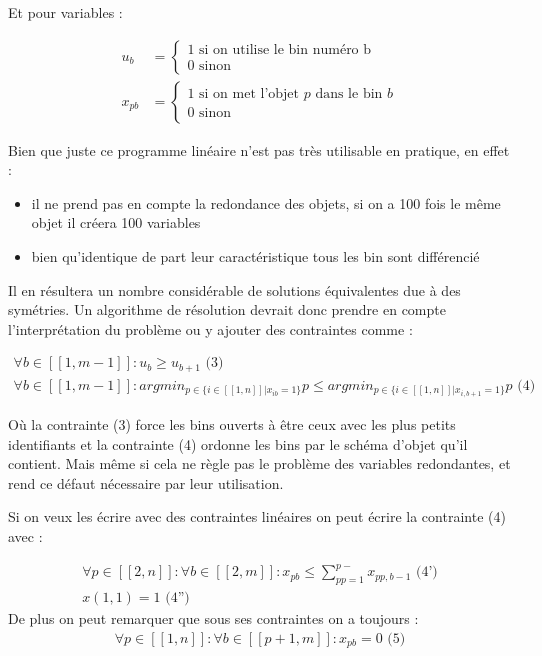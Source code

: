 \documentclass{article}
\begin{document}
Et pour variables :

\begin{align*}
    u_b &= \begin{cases}
        1 \text{ si on utilise le bin numéro b} \\
        0 \text{ sinon}
    \end{cases} \\
    x_{pb} &= \begin{cases}
            1 \text{ si on met l'objet $p$ dans le bin $b$} \\
            0 \text{ sinon}
    \end{cases}
\end{align*}

Bien que juste ce programme linéaire n'est pas très utilisable en pratique, en effet :

\begin{itemize}
    \item il ne prend pas en compte la redondance des objets, si on a 100 fois le même objet il créera 100 variables
    \item bien qu'identique de part leur caractéristique tous les bin sont différencié
\end{itemize}

Il en résultera un nombre considérable de solutions équivalentes due à des symétries. Un algorithme de résolution devrait donc prendre en compte l’interprétation du problème ou y ajouter des contraintes comme :

\begin{align*}
 \forall b \in [\![ 1 , m-1 ]\!] : u_b \geqslant u_{b+1} \text{ (3)}\\
 \forall b \in [\![ 1 , m-1 ]\!] : argmin_{ p \in \{ i \in [\![ 1 , n ]\!] | x_{ib} = 1 \} } p \leqslant argmin_{ p \in \{ i \in [\![ 1 , n ]\!] | x_{i,b+1} = 1 \} } p \text{ (4)}
\end{align*}

Où la contrainte (3) force les bins ouverts à être ceux avec les plus petits identifiants et la contrainte (4) ordonne les bins par le schéma d'objet qu'il contient. Mais même si cela ne règle pas le problème des variables redondantes, et rend ce défaut nécessaire par leur utilisation. \newline

Si on veux les écrire avec des contraintes linéaires on peut écrire la contrainte (4) avec :

\begin{align*}
 \forall p \in [\![ 2 , n ]\!] : \forall b \in [\![ 2 , m ]\!] : x_{pb} \leqslant \sum \limits_{pp = 1}^{p-} x_{pp,b-1} \text{ (4')}\\
 x(1,1) = 1 \text{ (4'')}
\end{align*}
De plus on peut remarquer que sous ses contraintes on a toujours :
\begin{align*}
 \forall p \in [\![ 1 , n ]\!] : \forall b \in [\![ p+1 , m ]\!] : x_{pb} = 0 \text{ (5)}
\end{align*}
\end{document}
